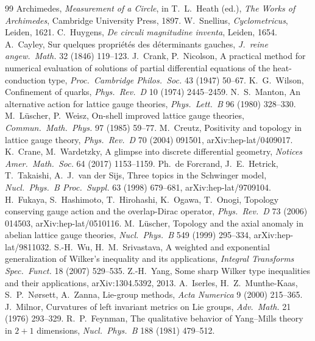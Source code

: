 \documentclass[11pt]{article}
\begin{document}
\begin{thebibliography}{99}\small
{} Archimedes, \emph{Measurement of a Circle}, in T.~L.~Heath (ed.), \emph{The Works of Archimedes}, Cambridge University Press, 1897.
 W.~Snellius, \emph{Cyclometricus}, Leiden, 1621.
 C.~Huygens, \emph{De circuli magnitudine inventa}, Leiden, 1654.
 A.~Cayley, Sur quelques propri\'et\'es des d\'eterminants gauches, \emph{J.\ reine angew.\ Math.} 32 (1846) 119--123.
 J.~Crank, P.~Nicolson, A practical method for numerical evaluation of solutions of partial differential equations of the heat-conduction type, \emph{Proc.\ Cambridge Philos.\ Soc.} 43 (1947) 50--67.
 K.~G.~Wilson, Confinement of quarks, \emph{Phys.\ Rev.\ D} 10 (1974) 2445--2459.
 N.~S.~Manton, An alternative action for lattice gauge theories, \emph{Phys.\ Lett.\ B} 96 (1980) 328--330.
 M.~L\"uscher, P.~Weisz, On-shell improved lattice gauge theories, \emph{Commun.\ Math.\ Phys.} 97 (1985) 59--77.
 M.~Creutz, Positivity and topology in lattice gauge theory, \emph{Phys.\ Rev.\ D} 70 (2004) 091501, arXiv:hep-lat/0409017.
 K.~Crane, M.~Wardetzky, A glimpse into discrete differential geometry, \emph{Notices Amer.\ Math.\ Soc.} 64 (2017) 1153--1159.
 Ph.~de Forcrand, J.~E.~Hetrick, T.~Takaishi, A.~J.~van der Sijs, Three topics in the Schwinger model, \emph{Nucl.\ Phys.\ B Proc.\ Suppl.} 63 (1998) 679--681, arXiv:hep-lat/9709104.
 H.~Fukaya, S.~Hashimoto, T.~Hirohashi, K.~Ogawa, T.~Onogi, Topology conserving gauge action and the overlap-Dirac operator, \emph{Phys.\ Rev.\ D} 73 (2006) 014503, arXiv:hep-lat/0510116.
 M.~L\"uscher, Topology and the axial anomaly in abelian lattice gauge theories, \emph{Nucl.\ Phys.\ B} 549 (1999) 295--334, arXiv:hep-lat/9811032.
 S.-H.~Wu, H.~M.~Srivastava, A weighted and exponential generalization of Wilker's inequality and its applications, \emph{Integral Transforms Spec.\ Funct.} 18 (2007) 529--535.
 Z.-H.~Yang, Some sharp Wilker type inequalities and their applications, arXiv:1304.5392, 2013.
 A.~Iserles, H.~Z.~Munthe-Kaas, S.~P.~N{\o}rsett, A.~Zanna, Lie-group methods, \emph{Acta Numerica} 9 (2000) 215--365.
 J.~Milnor, Curvatures of left invariant metrics on Lie groups, \emph{Adv.\ Math.} 21 (1976) 293--329.
 R.~P.~Feynman, The qualitative behavior of Yang--Mills theory in $2+1$ dimensions, \emph{Nucl.\ Phys.\ B} 188 (1981) 479--512.

\end{thebibliography}
\end{document}
